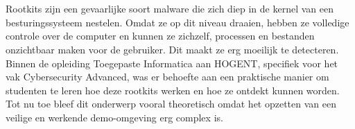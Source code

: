 
%
%
%
%
%

%



\chapter*{}

Rootkits zijn een gevaarlijke soort malware die zich diep in de kernel van een besturingssysteem nestelen. Omdat ze op dit niveau draaien, hebben ze volledige controle over de computer en kunnen ze zichzelf, processen en bestanden onzichtbaar maken voor de gebruiker. Dit maakt ze erg moeilijk te detecteren. Binnen de opleiding Toegepaste Informatica aan HOGENT, specifiek voor het vak Cybersecurity Advanced, was er behoefte aan een praktische manier om studenten te leren hoe deze rootkits werken en hoe ze ontdekt kunnen worden. Tot nu toe bleef dit onderwerp vooral theoretisch omdat het opzetten van een veilige en werkende demo-omgeving erg complex is.

